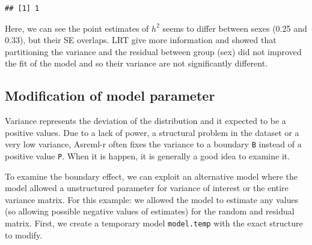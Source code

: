 \documentclass[
  12pt,
]{book}
\newenvironment{Shaded}{\begin{snugshade}}{\end{snugshade}}
\newcommand{\AttributeTok}[1]{\textcolor[rgb]{0.77,0.63,0.00}{#1}}
\newcommand{\DecValTok}[1]{\textcolor[rgb]{0.00,0.00,0.81}{#1}}
\newcommand{\FunctionTok}[1]{\textcolor[rgb]{0.00,0.00,0.00}{#1}}
\newcommand{\NormalTok}[1]{#1}
\newcommand{\OtherTok}[1]{\textcolor[rgb]{0.56,0.35,0.01}{#1}}
\newcommand{\SpecialCharTok}[1]{\textcolor[rgb]{0.00,0.00,0.00}{#1}}
\newcommand{\StringTok}[1]{\textcolor[rgb]{0.31,0.60,0.02}{#1}}
\begin{document}
\begin{verbatim}
## [1] 1
\end{verbatim}

Here, we can see the point estimates of \(h^2\) seems to differ between sexes (0.25 and 0.33), but their SE overlaps.
LRT give more information and showed that partitioning the variance and the residual between group (sex) did not improved the fit of the model and so their variance are not significantly different.

\hypertarget{modification-of-model-parameter}{%
\subsection{Modification of model parameter}\label{modification-of-model-parameter}}

Variance represents the deviation of the distribution and it expected to be a positive values.
Due to a lack of power, a structural problem in the dataset or a very low variance, Asreml-r often fixes the variance to a boundary \texttt{B} instead of a positive value \texttt{P}. When it is happen, it is generally a good idea to examine it.

To examine the boundary effect, we can exploit an alternative model where the model allowed a unstructured parameter for variance of interest or the entire variance matrix. For this example: we allowed the model to estimate any values (so allowing possible negative values of estimates) for the random and residual matrix.
First, we create a temporary model \texttt{model.temp} with the exact structure to modify.

\begin{Shaded}
\end{Shaded}
\end{document}

